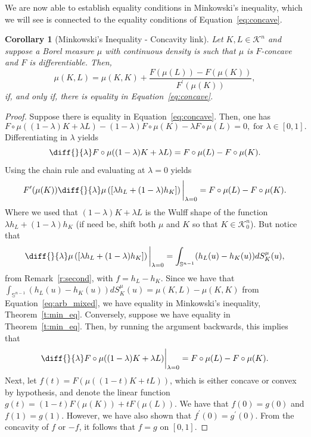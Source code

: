 \documentclass[11pt]{amsart}
\newtheorem{lemma}[theorem]{Lemma}
\newtheorem{corollary}[theorem]{Corollary}
\theoremstyle{definition}
\theoremstyle{remark}
\numberwithin{equation}{section}
\newcommand{\s}{\mathbb{S}}
\newcommand{\conbod}{\mathcal{K}^n}
\begin{document}
We are now able to establish equality conditions in Minkowski's inequality, which we will see is connected to the equality conditions of Equation~\ref{eq:concave}.
	\begin{corollary}[Minkowski's Inequality - Concavity link]
\label{cor:minkowski}
Let $K,L\in\conbod$ and suppose a Borel measure $\mu$ with continuous density is such that $\mu$ is $F$-concave and $F$ is differentiable. Then, $$
\mu(K, L) = \mu(K, K)+\frac{F(\mu(L))-F(\mu(K))}{F^{\prime}(\mu(K))},
$$
if, and only if, there is equality in Equation~\ref{eq:concave}.
\end{corollary}
\begin{proof}
Suppose there is equality in Equation~\ref{eq:concave}. Then, one has
$$F \circ \mu((1-\lambda) K+\lambda L)-(1-\lambda) F \circ \mu(K)-\lambda F \circ \mu(L)=0, \; \text{for }\lambda\in[0,1].$$
Differentiating in $\lambda$ yields $$\diff{}{\lambda} F \circ \mu((1-\lambda) K+\lambda L)=F\circ\mu(L)-F\circ\mu(K).$$
Using the chain rule and evaluating at $\lambda=0$ yields
$$F^{\prime}(\mu(K))\diff{}{\lambda} \mu\left(\left[\lambda h_{L}+(1-\lambda) h_{K}\right]\right)\bigg|_{\lambda=0}=F\circ\mu(L)-F\circ\mu(K).$$
Where we used that $(1-\lambda)K +\lambda L$ is the Wulff shape of the function $\lambda h_L + (1-\lambda)h_K$  (if need be, shift both $\mu$ and $K$ so that $K\in\conbod_0$).
But notice that 
$$\diff{}{\lambda} \mu\left(\left[\lambda h_{L}+(1-\lambda) h_{K}\right]\right)\bigg|_{\lambda=0}=\int_{\s^{n-1}}(h_L(u)-h_K(u))dS^{\mu}_{K}(u),$$
from Remark~\ref{r:second}, with $f=h_L-h_K$. Since we have that $\int_{\s^{n-1}}(h_L(u)-h_K(u))dS^{\mu}_{K}(u)=\mu(K,L)-\mu(K,K)$ from Equation~\ref{eq:arb_mixed}, we have equality in Minkowski's inequality, Theorem~\ref{t:min_eq}. Conversely, suppose we have equality in Theorem~\ref{t:min_eq}. Then, by running the argument backwards, this implies that
$$\diff{}{\lambda} F \circ \mu((1-\lambda) K+\lambda L)\bigg|_{\lambda=0}=F\circ\mu(L)-F\circ\mu(K).$$
Next, let $f(t)=F\left(\mu\left((1-t)K+t L\right)\right)$, which is either concave or convex by hypothesis, and denote the linear function $g(t)=(1-t) F(\mu(K)) +t F(\mu(L))$. We have that $f(0)=g(0)$ and $f(1)=g(1)$. However, we have also shown that $f^\prime(0)=g^\prime(0)$. From the concavity of $f$ or $-f$, it follows that $f=g$ on $[0,1]$.
\end{proof}
\end{document}
